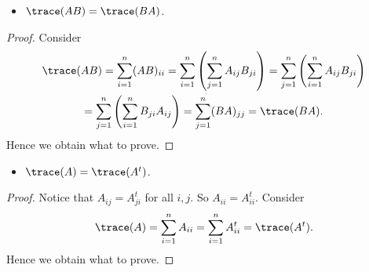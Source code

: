 \begin{Exercise}
	\begin{itemize}
		\item $\trace(AB) = \trace(BA)$.
	\end{itemize}
	\begin{proof}
		Consider
		\begin{gather*}
		\trace(AB)
		= \sum_{i=1}^{n} (AB)_{i i}
		= \sum_{i=1}^{n}\left( \sum_{j=1}^{n} A_{i j} B_{j i} \right)
		= \sum_{j=1}^{n} \left( \sum_{i=1}^{n} A_{i j} B_{j i} \right) \\
		= \sum_{j=1}^{n} \left( \sum_{i=1}^{n} B_{j i} A_{i j}  \right)
		= \sum_{j=1}^{n} (BA)_{j j}
		= \trace(BA).
		\end{gather*}
		Hence we obtain what to prove.
	\end{proof}
	
	\begin{itemize}
		\item $\trace(A) = \trace(A^t)$.
	\end{itemize}
	\begin{proof}
		Notice that $A_{i j} = A^t_{j i}$ for all $i,j$. So $A_{i i} = A^t_{i i}$.
		Consider
		$$
		\trace(A)
		= \sum_{i=1}^{n} A_{i i}
		= \sum_{i=1}^{n} A^t_{i i}
		= \trace(A^t).
		$$
		Hence we obtain what to prove.
	\end{proof}
\end{Exercise}